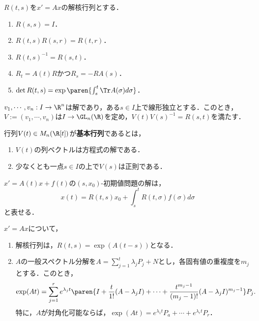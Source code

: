\documentclass[uplatex,dvipdfmx]{jsreport}
\begin{document}
\begin{lemma}
    $R(t,s)$を$x'=Ax$の解核行列とする．
    \begin{enumerate}
        \item $R(s,s)=I$．
        \item $R(t,s)R(s,r)=R(t,r)$．
        \item $R(t,s)^{-1}=R(s,t)$．
        \item $R_t=A(t)R$かつ$R_s=-RA(s)$．
        \item $\det R(t,s)=\exp\paren{\int^t_s\Tr A(\sigma)d\sigma}$．
    \end{enumerate}
\end{lemma}

\begin{theorem}[解核行列の構成]
    $v_1,\cdots,v_n:I\to\R^n$は解であり，ある$s\in I$上で線形独立とする．このとき，$V:=(v_1,\cdots,v_n)$は$I\to\GL_n(\R)$を定め，$V(t)V(s)^{-1}=R(s,t)$を満たす．
\end{theorem}

\begin{definition}
    行列$V(t)\in M_n(\R[t])$が\textbf{基本行列}であるとは，
    \begin{enumerate}
        \item $V(t)$の列ベクトルは方程式の解である．
        \item 少なくとも一点$s\in I$の上で$V(s)$は正則である．
    \end{enumerate}
\end{definition}

\begin{theorem}[非斉次方程式の解公式]
    $x'=A(t)x+f(t)$の$(s,x_0)$-初期値問題の解は，
    \[x(t)=R(t,s)x_0+\int^t_sR(t,\sigma)f(\sigma)d\sigma\]
    と表せる．
\end{theorem}

\begin{theorem}[定数係数の場合]
    $x'=Ax$について，
    \begin{enumerate}
        \item 解核行列は，$R(t,s)=\exp(A(t-s))$となる．
        \item $A$の一般スペクトル分解を$A=\sum_{j=1}^t\lambda_jP_j+N$とし，各固有値の重複度を$m_j$とする．このとき，
        \[\exp(At)=\sum_{j=1}^re^{\lambda_jt}\paren{I+\frac{t}{1!}(A-\lambda_jI)+\cdots+\frac{t^{m_j-1}}{(m_j-1)!}(A-\lambda_jI)^{m_j-1}}P_j.\]
        特に，$A$が対角化可能ならば，$\exp(At)=e^{\lambda_1t}P_a+\cdots+e^{\lambda_rt}P_r$．
    \end{enumerate}
\end{theorem}
\end{document}
